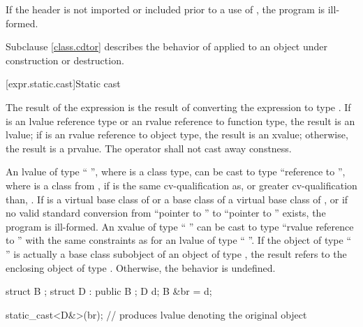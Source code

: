 \pnum
If the header 
is not imported or included prior
to a use of , the program is ill-formed.

\pnum
\begin{note}
Subclause \ref{class.cdtor} describes the behavior of 
applied to an object under construction or destruction.
\end{note}

[expr.static.cast]{Static cast}

\pnum
{}%
%
The result of the expression  is the result of
converting the expression  to type .
%
%
If  is an lvalue reference type
or an rvalue reference to function type, the result is an lvalue;
if  is an rvalue reference to object type, the result is an xvalue;
otherwise, the result is a prvalue. The  operator shall not cast
away constness.

\pnum
{}%
%
An lvalue of type `` '', where  is a class
type, can be cast to type ``reference to  '', where
 is a class  from ,
if  is the
same cv-qualification as, or greater cv-qualification than,
. If  is a virtual base class of 
or a base class of a virtual base class of ,
or if no valid standard conversion from ``pointer to ''
to ``pointer to '' exists, the program is ill-formed.
An xvalue of type
`` '' can be cast to type ``rvalue reference to
 '' with the same constraints as for an lvalue of
type `` ''. If the object
of type `` '' is actually a base class subobject of an object
of type , the result refers to the enclosing object of type
. Otherwise, the behavior is undefined.
\begin{example}
\begin{codeblock}
struct B { };
struct D : public B { };
D d;
B &br = d;

static_cast<D&>(br);            // produces lvalue denoting the original  object
\end{codeblock}
\end{example}

